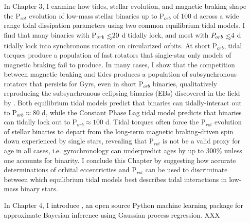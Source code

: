 In Chapter 3, I examine how tides, stellar evolution, and magnetic braking shape the P$_{rot}$ evolution of low-mass stellar binaries up to P$_{orb}$ of 100 d across a wide range tidal dissipation parameters using two common equilibrium tidal models. I find that many binaries with P$_{orb} \lsim 20$ d tidally lock, and most with $P_{orb} \lsim 4$ d tidally lock into synchronous rotation on circularized orbits. At short P$_{orb}$, tidal torques produce a population of fast rotators that single-star only models of magnetic braking fail to produce.  In many cases, I show that the competition between magnetic braking and tides produces a population of subsynchronous rotators that persists for Gyrs, even in short P$_{orb}$ binaries, qualitatively reproducing the subsynchronous eclipsing binaries (EBs) discovered in the \kepler field by \citet{Lurie2017}. Both equilibrium tidal models predict that binaries can tidally-interact out to P$_{orb} \approx 80$ d, while the Constant Phase Lag tidal model predicts that binaries can tidally lock out to P$_{orb} \approx 100$ d. Tidal torques often force the P$_{rot}$ evolution of stellar binaries to depart from the long-term magnetic braking-driven spin down experienced by single stars, revealing that P$_{rot}$ is not be a valid proxy for age in all cases, i.e. gyrochronology can underpredict ages by up to $300\%$ unless one accounts for binarity. I conclude this Chapter by suggesting how accurate determinations of orbital eccentricties and P$_{rot}$ can be used to discriminate between which equilibrium tidal models best describes tidal interactions in low-mass binary stars.
 
In Chapter 4, I introduce \approxposterior, an open source Python machine learning package for approximate Bayesian inference using Gaussian process regression. XXX
 
